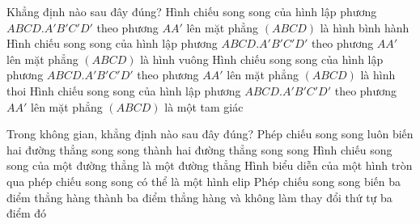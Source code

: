 \begin{ex}%
	 Khẳng định nào sau đây đúng?
	\choice 
		{Hình chiếu song song của hình lập  phương $ABCD.A'B'C'D'$ theo phương $AA'$ lên mặt phẳng $(ABCD)$ là hình bình hành}
		{\True Hình chiếu song song của hình lập phương $ABCD.A'B'C'D'$ theo phương $AA'$ lên mặt phẳng $(ABCD)$ là hình vuông} 
		{Hình chiếu song song của hình lập phương $ABCD.A'B'C'D'$ theo phương $AA'$ lên mặt phẳng $(ABCD)$ là hình  thoi}
		{Hình chiếu song song của  hình lập phương $ABCD.A'B'C'D'$ theo phương $AA'$ lên mặt phẳng $(ABCD)$ là một tam giác}
\end{ex}

\begin{ex}%
	Trong không gian, khẳng  định nào sau đây đúng?
	 \choice
		{Phép chiếu song song luôn biến hai đường  thẳng song song thành hai đường thẳng song song}
		 {Hình chiếu song song của một đường thẳng là một đường thẳng}
		{\True Hình  biểu diễn của một hình tròn qua phép chiếu song song có thể là một hình elip}
		{Phép chiếu song song  biến ba điểm thẳng hàng thành ba điểm thẳng hàng và không làm thay đổi thứ tự ba điểm đó}
\end{ex}

